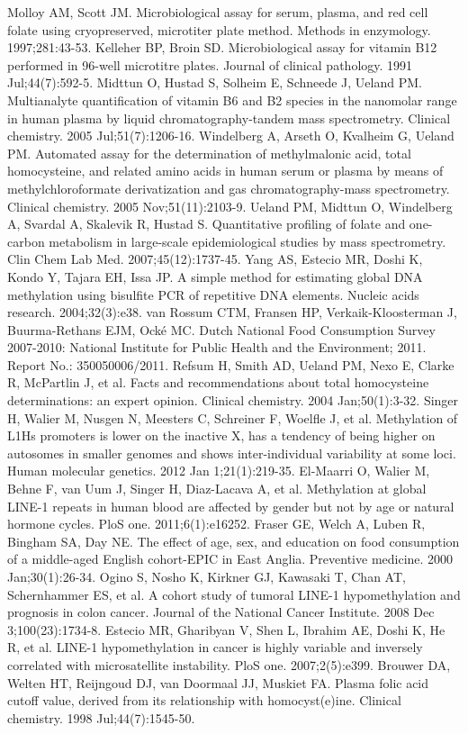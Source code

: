 \begin{thebibliography}{12}
		Molloy AM, Scott JM. Microbiological assay for serum, plasma, and red cell folate using cryopreserved, microtiter plate method. Methods in enzymology. 1997;281:43-53. 
		Kelleher BP, Broin SD. Microbiological assay for vitamin B12 performed in 96-well microtitre plates. Journal of clinical pathology. 1991 Jul;44(7):592-5. 
		Midttun O, Hustad S, Solheim E, Schneede J, Ueland PM. Multianalyte quantification of vitamin B6 and B2 species in the nanomolar range in human plasma by liquid chromatography-tandem mass spectrometry. Clinical chemistry. 2005 Jul;51(7):1206-16. 
		Windelberg A, Arseth O, Kvalheim G, Ueland PM. Automated assay for the determination of methylmalonic acid, total homocysteine, and related amino acids in human serum or plasma by means of methylchloroformate derivatization and gas chromatography-mass spectrometry. Clinical chemistry. 2005 Nov;51(11):2103-9. 
		Ueland PM, Midttun O, Windelberg A, Svardal A, Skalevik R, Hustad S. Quantitative profiling of folate and one-carbon metabolism in large-scale epidemiological studies by mass spectrometry. Clin Chem Lab Med. 2007;45(12):1737-45. 
		Yang AS, Estecio MR, Doshi K, Kondo Y, Tajara EH, Issa JP. A simple method for estimating global DNA methylation using bisulfite PCR of repetitive DNA elements. Nucleic acids research. 2004;32(3):e38. 
		van Rossum CTM, Fransen HP, Verkaik-Kloosterman J, Buurma-Rethans EJM, Ock{\'e} MC. Dutch National Food Consumption Survey 2007-2010: National Institute for Public Health and the Environment; 2011. Report No.: 350050006/2011. 
		Refsum H, Smith AD, Ueland PM, Nexo E, Clarke R, McPartlin J, et al. Facts and recommendations about total homocysteine determinations: an expert opinion. Clinical chemistry. 2004 Jan;50(1):3-32. 
		Singer H, Walier M, Nusgen N, Meesters C, Schreiner F, Woelfle J, et al. Methylation of L1Hs promoters is lower on the inactive X, has a tendency of being higher on autosomes in smaller genomes and shows inter-individual variability at some loci. Human molecular genetics. 2012 Jan 1;21(1):219-35. 
		El-Maarri O, Walier M, Behne F, van Uum J, Singer H, Diaz-Lacava A, et al. Methylation at global LINE-1 repeats in human blood are affected by gender but not by age or natural hormone cycles. PloS one. 2011;6(1):e16252. 
		Fraser GE, Welch A, Luben R, Bingham SA, Day NE. The effect of age, sex, and education on food consumption of a middle-aged English cohort-EPIC in East Anglia. Preventive medicine. 2000 Jan;30(1):26-34. 
		Ogino S, Nosho K, Kirkner GJ, Kawasaki T, Chan AT, Schernhammer ES, et al. A cohort study of tumoral LINE-1 hypomethylation and prognosis in colon cancer. Journal of the National Cancer Institute. 2008 Dec 3;100(23):1734-8. 
		Estecio MR, Gharibyan V, Shen L, Ibrahim AE, Doshi K, He R, et al. LINE-1 hypomethylation in cancer is highly variable and inversely correlated with microsatellite instability. PloS one. 2007;2(5):e399. 
		Brouwer DA, Welten HT, Reijngoud DJ, van Doormaal JJ, Muskiet FA. Plasma folic acid cutoff value, derived from its relationship with homocyst(e)ine. Clinical chemistry. 1998 Jul;44(7):1545-50. 
\end{thebibliography} 
